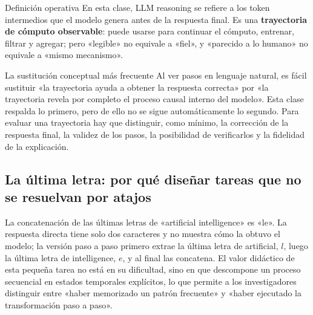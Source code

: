 
\begin{importantbox}{Definición operativa}
En esta clase, LLM reasoning se refiere a los token intermedios que el modelo genera antes de la respuesta final. Es una \textbf{trayectoria de cómputo observable}: puede usarse para continuar el cómputo, entrenar, filtrar y agregar; pero «legible» no equivale a «fiel», y «parecido a lo humano» no equivale a «mismo mecanismo».
\end{importantbox}

\begin{warningbox}{La sustitución conceptual más frecuente}
Al ver pasos en lenguaje natural, es fácil sustituir «la trayectoria ayuda a obtener la respuesta correcta» por «la trayectoria revela por completo el proceso causal interno del modelo». Esta clase respalda lo primero, pero de ello no se sigue automáticamente lo segundo. Para evaluar una trayectoria hay que distinguir, como mínimo, la corrección de la respuesta final, la validez de los pasos, la posibilidad de verificarlos y la fidelidad de la explicación.
\end{warningbox}

\subsection{La última letra: por qué diseñar tareas que no se resuelvan por atajos}

La concatenación de las últimas letras de «artificial intelligence» es «le». La respuesta directa tiene solo dos caracteres y no muestra cómo la obtuvo el modelo; la versión paso a paso primero extrae la última letra de artificial, $l$, luego la última letra de intelligence, $e$, y al final las concatena. El valor didáctico de esta pequeña tarea no está en su dificultad, sino en que descompone un proceso secuencial en estados temporales explícitos, lo que permite a los investigadores distinguir entre «haber memorizado un patrón frecuente» y «haber ejecutado la transformación paso a paso».



